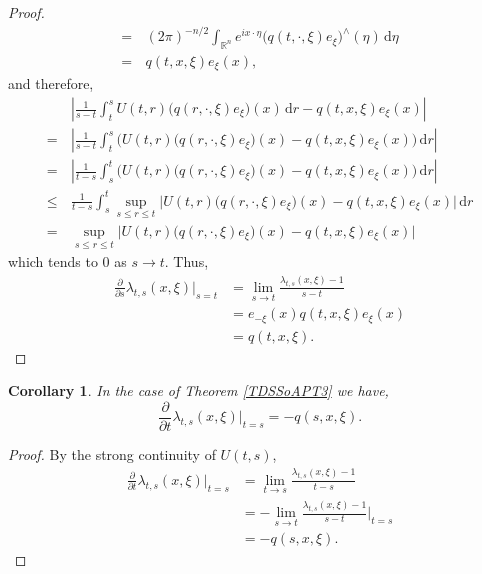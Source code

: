 \documentclass[a4paper, 12pt]{report}
\newtheorem{corollary}[theorem]{Corollary}
\theoremstyle{remark}
\theoremstyle{definition}
\begin{document}
\begin{proof}
$$\begin{aligned}
= & \, (2\pi)^{-n/2}\int_{\mathbb{R}^n}e^{ix\cdot\eta}\big(q(t, \cdot, \xi)e_\xi\big)^\wedge(\eta)\,\mathrm{d}\eta\\
= & \, q(t, x, \xi)e_\xi(x),
\end{aligned}
$$
and therefore,
$$
\begin{aligned}
& \, \left|\frac{1}{s - t}\int_t^sU(t, r)\big(q(r, \cdot, \xi)e_\xi\big)(x)\,\mathrm{d}r - q(t, x, \xi)e_\xi(x)\right|\\
= & \, \left|\frac{1}{s - t}\int_t^s\Big(U(t, r)\big(q(r, \cdot, \xi)e_\xi\big)(x) - q(t, x, \xi)e_\xi(x)\Big)\,\mathrm{d}r\right|\\
= & \, \left|\frac{1}{t - s}\int_s^t\Big(U(t, r)\big(q(r, \cdot, \xi)e_\xi\big)(x) - q(t, x, \xi)e_\xi(x)\Big)\,\mathrm{d}r\right|\\
\le & \, \frac{1}{t - s}\int_s^t\sup_{s \le r \le t}\Big|U(t, r)\big(q(r, \cdot, \xi)e_\xi\big)(x) - q(t, x, \xi)e_\xi(x)\Big|\,\mathrm{d}r\\
= & \, \sup_{s \le r \le t}\Big|U(t, r)\big(q(r, \cdot, \xi)e_\xi\big)(x) - q(t, x, \xi)e_\xi(x)\Big|
\end{aligned}
$$
which tends to $0$ as $s \to t$.  Thus,
$$
\begin{aligned}
\frac{\partial}{\partial s}\lambda_{t, s}(x, \xi)\bigg|_{s = t} & = \lim_{s \to t}\frac{\lambda_{t, s}(x, \xi) - 1}{s - t}\\
& = e_{-\xi}(x)q(t, x, \xi)e_\xi(x)\\
& = q(t, x, \xi).
\end{aligned}
$$
\end{proof}
\begin{corollary}
In the case of Theorem \ref{TDSSoAPT3} we have,
\begin{equation}
\frac{\partial}{\partial t}\lambda_{t, s}(x, \xi)\bigg|_{t = s} = -q(s, x, \xi).
\end{equation}
\end{corollary}
\begin{proof}
By the strong continuity of $U(t, s)$,
$$
\begin{aligned}
\frac{\partial}{\partial t}\lambda_{t, s}(x, \xi)\bigg|_{t = s} & = \lim_{t \to s}\frac{\lambda_{t, s}(x, \xi) - 1}{t - s}\\
& = -\lim_{s \to t}\frac{\lambda_{t, s}(x, \xi) - 1}{s - t}\bigg|_{t = s}\\
& = -q(s, x, \xi).
\end{aligned}
$$
\end{proof}

\newpage\null
\end{document}
